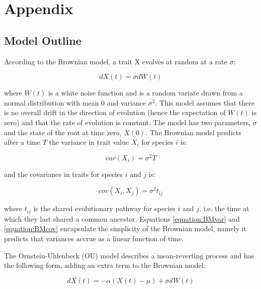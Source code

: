\documentclass[a4paper,12pt]{article}
\begin{document}



\section{Appendix}
\subsection{Model Outline} %
\label{section:models} 
According to the Brownian model, a trait X evolves at random at a rate $\sigma$:

  \begin{equation}
    dX(t) = \sigma dW(t)
  \end{equation}

where $W(t)$ is a white noise function and is a random variate drawn from a normal distribution with mean $0$ and variance $\sigma^2$. This model assumes that there is no overall drift in the direction of evolution (hence the expectation of $W(t)$ is zero) and that the rate of evolution is constant. The model has two parameters, $\sigma$ and the state of the root at time zero, $X(0)$. The Brownian model predicts after a time $T$ the variance in trait value $X_i$ for species $i$ is:

  \begin{equation}
    var(X_i) = \sigma^2 T
    \label{equation:BMvar} 
  \end{equation}

and the covariance in traits for species $i$ and $j$ is:
  
  \begin{equation}
    cov(X_i,X_j) = \sigma^2 t_{ij}
    \label{equation:BMcov} 
  \end{equation}

where $t_{ij}$ is the shared evolutionary pathway for species $i$ and $j$, i.e. the time at which they last shared a common ancestor. Equations \ref{equation:BMvar} and \ref{equation:BMcov} encapsulate the simplicity of the Brownian model, namely it predicts that variances accrue as a linear function of time. 

The Ornstein-Uhlenbeck (OU) model describes a mean-reverting process and has the following form, adding an extra term to the Brownian model:

  \begin{equation}
    dX(t) = - \alpha (X(t) - \mu) + \sigma dW(t)
  \end{equation}
\end{document}
